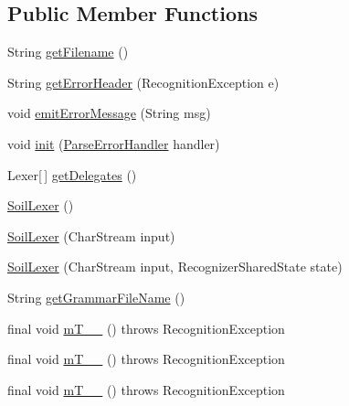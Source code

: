 \subsection*{Public Member Functions}
\begin{DoxyCompactItemize}
\item 
String \hyperlink{classorg_1_1tzi_1_1use_1_1parser_1_1soil_1_1_soil_lexer_a75be91aa9e820cd62b31318f4d0d5398}{get\-Filename} ()
\item 
String \hyperlink{classorg_1_1tzi_1_1use_1_1parser_1_1soil_1_1_soil_lexer_ae14f4bf262ede337e705886771192615}{get\-Error\-Header} (Recognition\-Exception e)
\item 
void \hyperlink{classorg_1_1tzi_1_1use_1_1parser_1_1soil_1_1_soil_lexer_ab12a9bc978563973fdaed30a4fb7d1cb}{emit\-Error\-Message} (String msg)
\item 
void \hyperlink{classorg_1_1tzi_1_1use_1_1parser_1_1soil_1_1_soil_lexer_abb19115019f1d320e33a576564651b8e}{init} (\hyperlink{classorg_1_1tzi_1_1use_1_1parser_1_1_parse_error_handler}{Parse\-Error\-Handler} handler)
\item 
Lexer\mbox{[}$\,$\mbox{]} \hyperlink{classorg_1_1tzi_1_1use_1_1parser_1_1soil_1_1_soil_lexer_a4c092c4fbeec7938c9e911058906480c}{get\-Delegates} ()
\item 
\hyperlink{classorg_1_1tzi_1_1use_1_1parser_1_1soil_1_1_soil_lexer_a8b5b85e093b6c7b6c95e824a2565ff0b}{Soil\-Lexer} ()
\item 
\hyperlink{classorg_1_1tzi_1_1use_1_1parser_1_1soil_1_1_soil_lexer_acd30640168405eb26f8b1ae16f748cbf}{Soil\-Lexer} (Char\-Stream input)
\item 
\hyperlink{classorg_1_1tzi_1_1use_1_1parser_1_1soil_1_1_soil_lexer_a7e0cdc2f38095ca4fedde460244ba998}{Soil\-Lexer} (Char\-Stream input, Recognizer\-Shared\-State state)
\item 
String \hyperlink{classorg_1_1tzi_1_1use_1_1parser_1_1soil_1_1_soil_lexer_a76741e585a310fe3e9531930f1799eb8}{get\-Grammar\-File\-Name} ()
\item 
final void \hyperlink{classorg_1_1tzi_1_1use_1_1parser_1_1soil_1_1_soil_lexer_a73c7c807178244d51f2e24800fe3fb30}{m\-T\-\_\-\-\_} ()  throws Recognition\-Exception 
\item 
final void \hyperlink{classorg_1_1tzi_1_1use_1_1parser_1_1soil_1_1_soil_lexer_a3895b312caf716639fab7efd56cc6c1e}{m\-T\-\_\-\-\_} ()  throws Recognition\-Exception 
\item 
final void \hyperlink{classorg_1_1tzi_1_1use_1_1parser_1_1soil_1_1_soil_lexer_a1c796093d22bbce2c62ce4bdf7996341}{m\-T\-\_\-\-\_} ()  throws Recognition\-Exception 

\end{DoxyCompactItemize}
